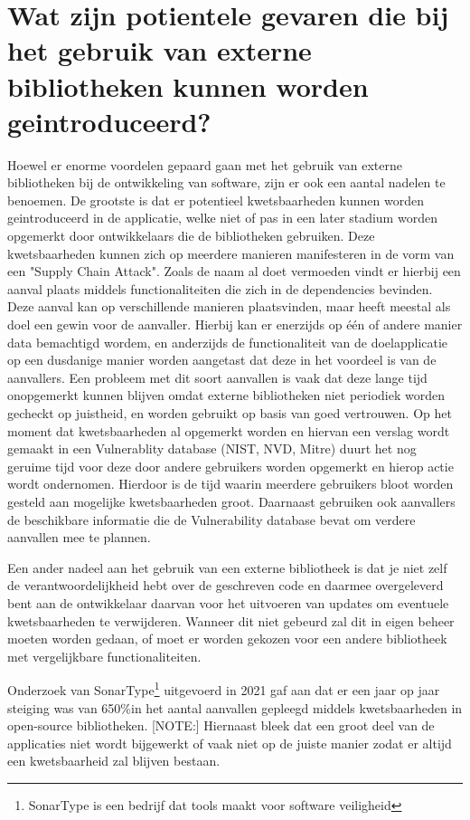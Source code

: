 \section{Wat zijn potientele gevaren die bij het gebruik van externe bibliotheken kunnen worden geintroduceerd?}\label{sec:wat-zijn-potienteel-gevaren-die-het-gebruik-van-externe-bibliotheken-kunnen-introduceren?}
Hoewel er enorme voordelen gepaard gaan met het gebruik van externe bibliotheken bij de ontwikkeling van software, zijn er ook een aantal nadelen te benoemen. De grootste is dat er potentieel kwetsbaarheden kunnen worden geintroduceerd in de applicatie, welke niet of pas in een later stadium worden opgemerkt door ontwikkelaars die de bibliotheken gebruiken. Deze kwetsbaarheden kunnen zich op meerdere manieren manifesteren in de vorm van een "Supply Chain Attack". Zoals de naam al doet vermoeden vindt er hierbij een aanval plaats middels functionaliteiten die zich in de dependencies bevinden. Deze aanval kan op verschillende manieren plaatsvinden, maar heeft meestal als doel een gewin voor de aanvaller. Hierbij kan er enerzijds op één of andere manier data bemachtigd wordem, en anderzijds de functionaliteit van de doelapplicatie op een dusdanige manier worden aangetast dat deze in het voordeel is van de aanvallers. Een probleem met dit soort aanvallen is vaak dat deze lange tijd onopgemerkt kunnen blijven omdat externe bibliotheken niet periodiek worden gecheckt op juistheid, en worden gebruikt op basis van goed vertrouwen. Op het moment dat kwetsbaarheden al opgemerkt worden en hiervan een verslag wordt gemaakt in een Vulnerablity database (NIST, NVD, Mitre) duurt het nog geruime tijd voor deze door andere gebruikers worden opgemerkt en hierop actie wordt ondernomen. Hierdoor is de tijd waarin meerdere gebruikers bloot worden gesteld aan mogelijke kwetsbaarheden groot. Daarnaast gebruiken ook aanvallers de beschikbare informatie die de Vulnerability database bevat om verdere aanvallen mee te plannen.

Een ander nadeel aan het gebruik van een externe bibliotheek is dat je niet zelf de verantwoordelijkheid hebt over de geschreven code en daarmee overgeleverd bent aan de ontwikkelaar daarvan voor het uitvoeren van updates om eventuele kwetsbaarheden te verwijderen. Wanneer dit niet gebeurd zal dit in eigen beheer moeten worden gedaan, of moet er worden gekozen voor een andere bibliotheek met vergelijkbare functionaliteiten.

Onderzoek van SonarType\footnote{SonarType is een bedrijf dat tools maakt voor software veiligheid} uitgevoerd in 2021 gaf aan dat er een jaar op jaar steiging was van 650\%in het aantal aanvallen gepleegd middels kwetsbaarheden in open-source bibliotheken.
[NOTE:] %
Hiernaast bleek dat een groot deel van de applicaties niet wordt bijgewerkt of vaak niet op de juiste manier zodat er altijd een kwetsbaarheid zal blijven bestaan.

